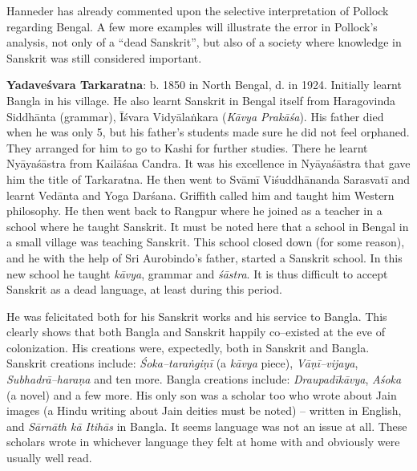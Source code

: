 Hanneder has already commented upon the selective interpretation of Pollock regarding Bengal. A few more examples will illustrate the error in Pollock’s analysis, not only of a “dead Sanskrit”, but also of a society where knowledge in Sanskrit was still considered important.

\textbf{Yadaveśvara Tarkaratna}: b. 1850 in North Bengal, d. in 1924. Initially learnt Bangla in his village. He also learnt Sanskrit in Bengal itself from Haragovinda Siddhānta (grammar), Īśvara Vidyālaṅkara (\textit{Kāvya Prakāśa}). His father died when he was only 5, but his father’s students made sure he did not feel orphaned. They arranged for him to go to Kashi for further studies. There he learnt Nyāyaśāstra from Kailāśaa Candra. It was his excellence in Nyāyaśāstra that gave him the title of Tarkaratna. He then went to Svāmī Viśuddhānanda Sarasvatī and learnt Vedānta and Yoga Darśana. Griffith called him and taught him Western philosophy. He then went back to Rangpur where he joined as a teacher in a school where he taught Sanskrit. It must be noted here that a school in Bengal in a small village was teaching Sanskrit. This school closed down (for some reason), and he with the help of Sri Aurobindo’s father, started a Sanskrit school. In this new school he taught \textit{kāvya}, grammar and \textit{śāstra}. It is thus difficult to accept Sanskrit as a dead language, at least during this period.

He was felicitated both for his Sanskrit works and his service to Bangla. This clearly shows that both Bangla and Sanskrit happily co–existed at the eve of colonization. His creations were, expectedly, both in Sanskrit and Bangla. Sanskrit creations include: \textit{Śoka–taraṅgiṇī} (a \textit{kāvya} piece), \textit{Vāṇī–vijaya}, \textit{Subhadrā–haraṇa} and ten more. Bangla creations include: \textit{Draupadīkāvya}, \textit{Aśoka} (a novel) and a few more. His only son was a scholar too who wrote about Jain images (a Hindu writing about Jain deities must be noted) – written in English, and \textit{Sārnāth kā Itihās} in Bangla. It seems language was not an issue at all. These scholars wrote in whichever language they felt at home with and obviously were usually well read.

